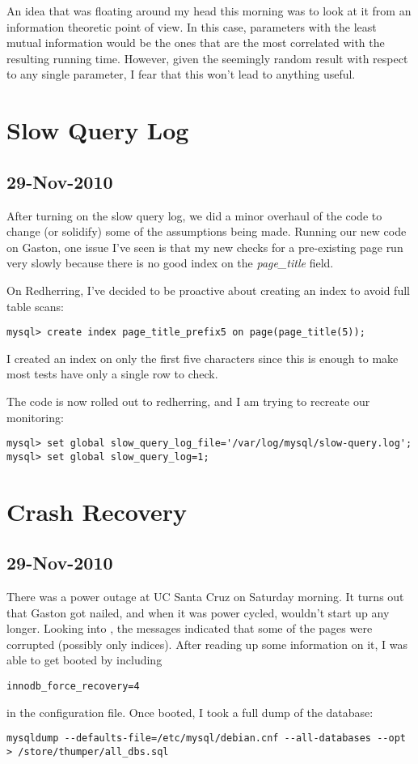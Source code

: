 An idea that was floating around my head this morning was to look
at it from an information theoretic point of view.
In this case, parameters with the least mutual information would be the
ones that are the most correlated with the resulting running time.
However, given the seemingly random result with respect to any
single parameter, I fear that this won't lead to anything useful.


\section{Slow Query Log}

\subsection{29-Nov-2010}

After turning on the slow query log, we did a minor overhaul of
the code to change (or solidify) some of the assumptions being made.
Running our new code on Gaston, one issue I've seen is that my new
checks for a pre-existing page run very slowly because there is no good index
on the \textit{page\_title} field.

On Redherring, I've decided to be proactive about creating an index to
avoid full table scans:
\begin{verbatim}
mysql> create index page_title_prefix5 on page(page_title(5));
\end{verbatim}
I created an index on only the first five characters since this is enough
to make most tests have only a single row to check.

The code is now rolled out to redherring, and I am trying to recreate our
monitoring:
\begin{verbatim}
mysql> set global slow_query_log_file='/var/log/mysql/slow-query.log';
mysql> set global slow_query_log=1;
\end{verbatim}

\section{Crash Recovery}

\subsection{29-Nov-2010}

There was a power outage at UC Santa Cruz on Saturday morning.
It turns out that Gaston got nailed, and when it was power cycled,
\mysql wouldn't start up any longer.
Looking into , the messages indicated that some
of the pages were corrupted (possibly only indices).
After reading up some information on it, I was able to get
\mysql booted by including
\begin{verbatim}
innodb_force_recovery=4
\end{verbatim}
in the configuration file.
Once booted, I took a full dump of the database:
\begin{verbatim}
mysqldump --defaults-file=/etc/mysql/debian.cnf --all-databases --opt > /store/thumper/all_dbs.sql
\end{verbatim}


